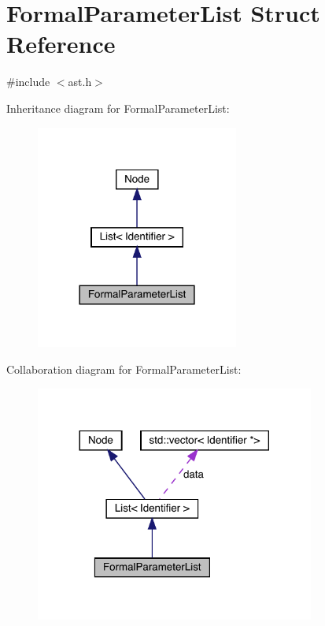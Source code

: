 \hypertarget{struct_formal_parameter_list}{}\section{Formal\+Parameter\+List Struct Reference}
\label{struct_formal_parameter_list}


{\ttfamily \#include $<$ast.\+h$>$}



Inheritance diagram for Formal\+Parameter\+List\+:
\nopagebreak
\begin{figure}[H]
\begin{center}
\leavevmode
\includegraphics[width=189pt]{struct_formal_parameter_list__inherit__graph}
\end{center}
\end{figure}


Collaboration diagram for Formal\+Parameter\+List\+:
\nopagebreak
\begin{figure}[H]
\begin{center}
\leavevmode
\includegraphics[width=260pt]{struct_formal_parameter_list__coll__graph}
\end{center}
\end{figure}
